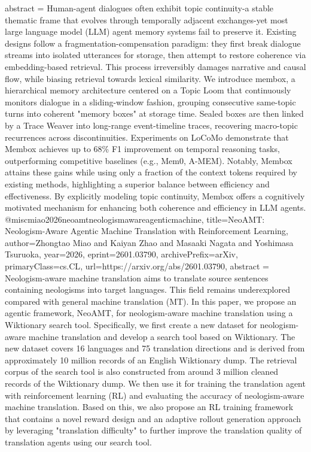 {      abstract = {Human-agent dialogues often exhibit topic continuity-a stable thematic frame that evolves through temporally adjacent exchanges-yet most large language model (LLM) agent memory systems fail to preserve it. Existing designs follow a fragmentation-compensation paradigm: they first break dialogue streams into isolated utterances for storage, then attempt to restore coherence via embedding-based retrieval. This process irreversibly damages narrative and causal flow, while biasing retrieval towards lexical similarity. We introduce membox, a hierarchical memory architecture centered on a Topic Loom that continuously monitors dialogue in a sliding-window fashion, grouping consecutive same-topic turns into coherent "memory boxes" at storage time. Sealed boxes are then linked by a Trace Weaver into long-range event-timeline traces, recovering macro-topic recurrences across discontinuities. Experiments on LoCoMo demonstrate that Membox achieves up to 68\% F1 improvement on temporal reasoning tasks, outperforming competitive baselines (e.g., Mem0, A-MEM). Notably, Membox attains these gains while using only a fraction of the context tokens required by existing methods, highlighting a superior balance between efficiency and effectiveness. By explicitly modeling topic continuity, Membox offers a cognitively motivated mechanism for enhancing both coherence and efficiency in LLM agents.}
}@misc{miao2026neoamtneologismawareagenticmachine,
      title={NeoAMT: Neologism-Aware Agentic Machine Translation with Reinforcement Learning}, 
      author={Zhongtao Miao and Kaiyan Zhao and Masaaki Nagata and Yoshimasa Tsuruoka},
      year={2026},
      eprint={2601.03790},
      archivePrefix={arXiv},
      primaryClass={cs.CL},
      url={https://arxiv.org/abs/2601.03790},
      abstract = {Neologism-aware machine translation aims to translate source sentences containing neologisms into target languages. This field remains underexplored compared with general machine translation (MT). In this paper, we propose an agentic framework, NeoAMT, for neologism-aware machine translation using a Wiktionary search tool. Specifically, we first create a new dataset for neologism-aware machine translation and develop a search tool based on Wiktionary. The new dataset covers 16 languages and 75 translation directions and is derived from approximately 10 million records of an English Wiktionary dump. The retrieval corpus of the search tool is also constructed from around 3 million cleaned records of the Wiktionary dump. We then use it for training the translation agent with reinforcement learning (RL) and evaluating the accuracy of neologism-aware machine translation. Based on this, we also propose an RL training framework that contains a novel reward design and an adaptive rollout generation approach by leveraging "translation difficulty" to further improve the translation quality of translation agents using our search tool.}
}
